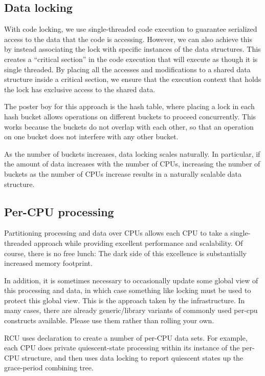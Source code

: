 \subsection{Data locking}

With code locking, we use single-threaded code execution to guarantee
serialized access to the data that the code is accessing.
However, we can also achieve this by instead associating the lock
with specific instances of the data structures.
This creates a ``critical section'' in the code execution that will
execute as though it is single threaded.
By placing all the accesses and modifications to a shared data structure
inside a critical section, we ensure that the execution context that
holds the lock has exclusive access to the shared data.

The poster boy for this approach is the hash table, where placing a lock
in each hash bucket allows operations on different buckets to proceed
concurrently.
This works because the buckets do not overlap with each other, so that
an operation on one bucket does not interfere with any other bucket.

As the number of buckets increases, data locking scales naturally.
In particular, if the amount of data increases with the number of CPUs,
increasing the number of buckets as the number of CPUs increase results
in a naturally scalable data structure.


\subsection{Per-CPU processing}

Partitioning processing and data over CPUs allows each CPU to take
a single-threaded approach while providing excellent performance and
scalability.
Of course, there is no free lunch:
The dark side of this excellence is substantially increased memory footprint.

In addition, it is sometimes necessary to occasionally update some global
view of this processing and data, in which case something like locking
must be used to protect this global view.
This is the approach taken by the  infrastructure.
In many cases, there are already generic/library variants of commonly
used per-cpu constructs available.
Please use them rather than rolling your own.

RCU uses  declaration to create a number of per-CPU
data sets.
For example, each CPU does private quiescent-state processing within
its instance of the per-CPU  structure, and then uses data
locking to report quiescent states up the grace-period combining tree.


